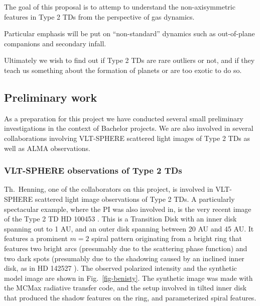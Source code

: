 \documentclass[10pt,fleqn,twoside]{article}
\begin{document}
\begin{highlight}
The goal of this proposal is to attemp to understand the non-axisymmetric
features in Type 2 TDs from the perspective of gas dynamics.
\end{highlight}
Particular
emphasis will be put on ``non-standard'' dynamics such as out-of-plane
companions and secondary infall.
\begin{highlight}
Ultimately we wish
to find out if Type 2 TDs are rare outliers or not, and if they teach us
something about the formation of planets or are too exotic to do so.
\end{highlight}



\subsection{Preliminary work}
As a preparation for this project we have conducted several small
preliminary investigations in the context of Bachelor projects. We are also
involved in several collaborations involving VLT-SPHERE scattered light
images of Type 2 TDs as well as ALMA observations.

\subsubsection{VLT-SPHERE observations of Type 2 TDs}
Th.~Henning, one of the collaborators on this project, is involved in
VLT-SPHERE scattered light image observations of Type 2 TDs. A particularly
spectacular example, where the PI was also involved in, is the very recent
image of the Type 2 TD HD 100453 \citep{2016arXiv161010089B}. This is a
Transition Disk with an inner disk spanning out to 1 AU, and an outer disk
spanning between 20 AU and 45 AU. It features a prominent $m=2$ spiral
pattern originating from a bright ring that features two bright arcs
(presumably due to the scattering phase function) and two dark spots
(presumably due to the shadowing caused by an inclined inner disk, as in HD
142527 \citep{2015ApJ...798L..44M}). The observed polarized intensity
and the synthetic model image are shown in Fig.~\ref{fig-benisty}. The
synthetic image was made with the MCMax radiative transfer code, and
the setup involved in tilted inner disk that produced the shadow features
on the ring, and parameterized spiral features.
\end{document}
